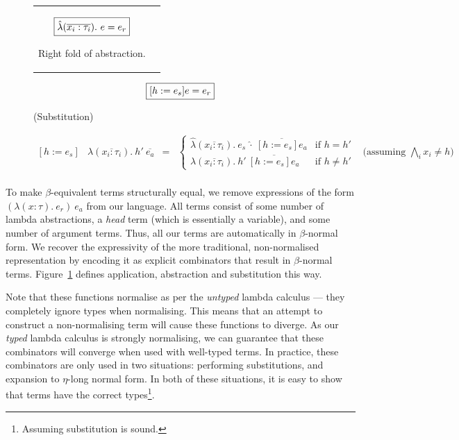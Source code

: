 \documentclass[a4paper]{jfp}
\begin{document}
\begin{figure}[H]
\begin{tabular}{p{}p{}}
   	\begin{displaymath}
              \text{\framebox{$ \hat{\lambda}(\overline{x_i : \tau_i}).\ e = e_r $}}
	\end{displaymath}
   \begin{center}
           Right fold of abstraction.
   \end{center}
   \end{tabular}
   \begin{displaymath}
           \text{\framebox{$ [h := e_s] e = e_r $}}
   \end{displaymath}
   \begin{center}
           (Substitution)
   \end{center}
     \begin{displaymath}
     \begin{array}{rlclr}
             [ h := e_s ] & \lambda(\overline{x_i : \tau_i}).\ h'\ \overline{e_a} & = &
                 \begin{cases}
                         \hat{\lambda}(\overline{x_i : \tau_i}).\ e_s\ \hat{\cdot}\ \overline{[ h := e_s ]e_a} & \text{if $h = h'$}
                         \\  \lambda(\overline{x_i : \tau_i }).\ h'\ \overline{[h := e_s]e_a} & \text{if $h \neq h'$}
                 \end{cases} & \text{(assuming $\bigwedge_i x_i \neq h$)}  \\
     \end{array}
     \end{displaymath}

   \label{fig:appsubst}
   \end{figure}

To make $\beta$-equivalent terms structurally equal, we remove expressions of the form
$(\lambda(x : \tau).\ e_r)\ e_a$ from our language.
All terms consist of some number of lambda abstractions, a \emph{head} term
(which is essentially a variable), and some number of argument terms. Thus, all
our terms are automatically in $\beta$-normal form.  We recover the
expressivity of the more traditional, non-normalised representation by encoding
it as explicit combinators that result in $\beta$-normal terms.
Figure~\ref{fig:appsubst} defines application, abstraction and substitution
this way.

Note that these functions normalise as per the \emph{untyped} lambda calculus --- they completely
ignore types when normalising. This means that an attempt to construct a non-normalising term will cause
these functions to diverge. As our \emph{typed} lambda calculus is strongly normalising, we can
guarantee that these combinators will converge when used with well-typed terms. In
practice, these combinators are only used in two situations: performing substitutions, and expansion to $\eta$-long normal form. In both of these situations, it is easy to show that terms have the correct types\footnote{Assuming substitution is sound.}.
\end{document}
